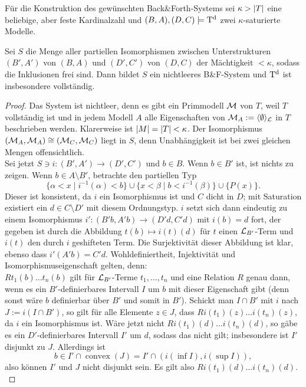 \newpage
Für die Konstruktion des gewünschten Back\&Forth-Systems sei $\kappa>{\left| T \right|}$ eine beliebige, aber feste Kardinalzahl und $(B,A),(D,C)\models\operatorname{T^d}$ zwei $\kappa$-saturierte Modelle.
\begin{theorem}\label{BackForth}
	Sei $S$ die Menge aller partiellen Isomorphismen zwischen Unterstrukturen $(B',A')$ von $(B,A)$ und $(D',C')$ von $(D,C)$ der Mächtigkeit $<\kappa$, sodass die Inklusionen frei sind. Dann bildet $S$ ein nichtleeres B\&F-System und $\operatorname{T^d}$ ist insbesondere vollständig.
\end{theorem}
\begin{proof}
	Das System ist nichtleer, denn es gibt ein Primmodell $\mathcal{M}$ von $T$, weil $T$ vollständig ist und in jedem Modell $A$ alle Eigenschaften von $\mathcal{M}_A:=\langle\emptyset\rangle_{\mathcal{L}}$ in $T$ beschrieben werden. Klarerweise ist ${\left| M \right|}={\left| T \right|}<\kappa$. Der Isomorphismus $(\mathcal{M}_A,\mathcal{M}_A)\cong(\mathcal{M}_C,\mathcal{M}_C)$ liegt in $S$, denn Unabhängigkeit ist bei zwei gleichen Mengen offensichtlich.\\
	Sei jetzt $S\ni i:(B',A')\rightarrow(D',C')$ und $b\in B$. Wenn $b\in B'$ ist, ist nichts zu zeigen. Wenn $b\in A\setminus B'$, betrachte den partiellen Typ $$\{\alpha<x\mid i^{-1}(\alpha)<b\}\cup\{x<\beta\mid b<i^{-1}(\beta)\}\cup\{P(x)\}.$$
	Dieser ist konsistent, da $i$ ein Isomorphismus ist und $C$ dicht in $D$; mit Saturation existiert ein $d\in C\setminus D'$ mit diesem Ordnungstyp. $i$ setzt sich dann eindeutig zu einem Isomorphismus $i':(B'b,A'b)\rightarrow(D'd,C'd)$ mit $i(b)=d$ fort, der gegeben ist durch die Abbildung $t(b)\mapsto i(t)(d)$ für $t$ einen $\mathcal{L}_{B'}$-Term und $i(t)$ den durch $i$ geshifteten Term. Die Surjektivität dieser Abbildung ist klar, ebenso dass $i'(A'b)=C'd$. Wohldefiniertheit, Injektivität und Isomorphismuseigenschaft gelten, denn:\\
	$Rt_1(b)\dots t_n(b)$ gilt für $\mathcal{L}_{B'}$-Terme $t_1,\dots,t_n$ und eine Relation $R$ genau dann, wenn es ein $B'$-definierbares Intervall $I$ um $b$ mit dieser Eigenschaft gibt (denn sonst wäre $b$ definierbar über $B'$ und somit in $B'$). Schickt man $I\cap B'$ mit $i$ nach $J:=i(I\cap B')$, so gilt für alle Elemente $z\in J$, dass $Ri(t_1)(z)\dots i(t_n)(z)$, da $i$ ein Isomorphismus ist. Wäre jetzt nicht $Ri(t_1)(d)\dots i(t_n)(d)$, so gäbe es ein $D'$-definierbares Intervall $I'$ um $d$, sodass das nicht gilt; insbesondere ist $I'$ disjunkt zu $J$. Allerdings ist $$b\in I'\cap\operatorname{convex}(J)=I'\cap(i(\inf I),i(\sup I)),$$ also können $I'$ und $J$ nicht disjunkt sein. Es gilt also $Ri(t_1)(d)\dots i(t_n)(d)$.\\

\end{proof}
